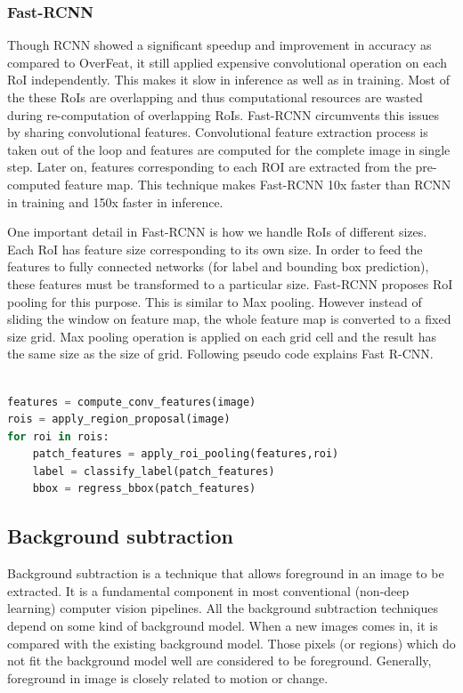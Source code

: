 \subsubsection{Fast-RCNN}
Though RCNN showed a significant speedup and improvement in accuracy as compared to OverFeat, it still applied expensive convolutional operation on each RoI independently. This makes it slow in inference as well as in training. Most of the these RoIs are overlapping and thus computational resources are wasted during re-computation of overlapping RoIs.  Fast-RCNN\cite{ref_fastrcnn} circumvents this issues by sharing convolutional features. Convolutional feature extraction process is taken out of the loop and features are computed for the complete image in single step. Later on, features corresponding to each ROI are extracted from the pre-computed feature map. This technique 
makes Fast-RCNN 10x faster than RCNN in training and 150x faster in inference.

One important detail in Fast-RCNN is how we handle RoIs of different sizes. Each RoI has feature size corresponding to its own size. In order to feed the features to fully connected networks (for label and bounding box prediction), these features must be transformed to a particular size.  Fast-RCNN proposes RoI pooling for this purpose. This is similar to Max pooling. However instead of sliding the window on feature map, the whole feature map is converted to a fixed size grid. Max pooling operation is applied on each grid cell and the result has the same size as the size of grid. Following pseudo code explains Fast R-CNN.

\begin{lstlisting}[language=Python, caption=Fast-RCNN pseudo code]

features = compute_conv_features(image)
rois = apply_region_proposal(image)
for roi in rois:
    patch_features = apply_roi_pooling(features,roi)
    label = classify_label(patch_features)
    bbox = regress_bbox(patch_features)
\end{lstlisting}

\subsection{Background subtraction}
Background subtraction is a technique that allows foreground in an image to be extracted. It is a fundamental component in  most conventional (non-deep learning) computer vision pipelines. All the background subtraction techniques depend on some kind of background model. When a new images comes in, it is compared with the existing background model. Those pixels (or regions) which do not fit the background model well are considered to be foreground. Generally, foreground in image is closely related to motion or change. 

